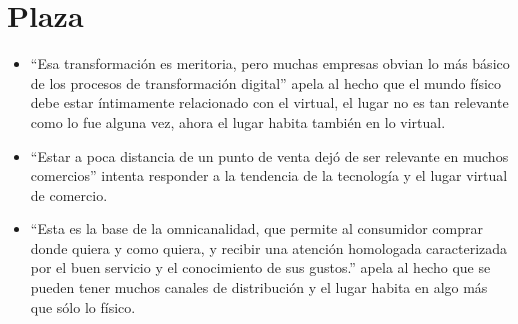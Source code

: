\documentclass{article}
\begin{document}
\section{Plaza}
\begin{itemize}
    \item ``Esa transformación es meritoria, pero muchas empresas obvian lo más básico de los procesos de transformación digital'' apela al hecho que el mundo físico debe estar íntimamente relacionado con el virtual, el lugar no es tan relevante como lo fue alguna vez, ahora el lugar habita también en lo virtual. 
    \item ``Estar a poca distancia de un punto de venta dejó de ser relevante en muchos comercios'' intenta responder a la tendencia de la tecnología y el lugar virtual de comercio. 
    \item ``Esta es la base de la omnicanalidad, que permite al consumidor comprar donde quiera y como quiera, y recibir una atención homologada caracterizada por el buen servicio y el conocimiento de sus gustos.'' apela al hecho que se pueden tener muchos canales de distribución y el lugar habita en algo más que sólo lo físico. 
\end{itemize}



\end{document}
